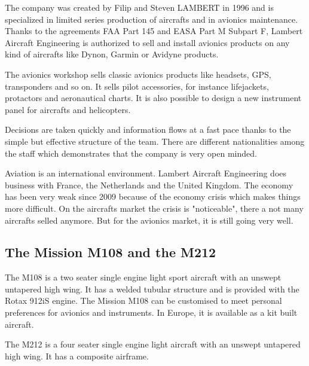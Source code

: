 \documentclass[11pt,a4paper]{article}
\begin{document}

The company was created by Filip and Steven LAMBERT in 1996 and is specialized in limited series production of aircrafts and in avionics maintenance. Thanks to the agreements FAA Part 145 and EASA Part M Subpart F, Lambert Aircraft Engineering is authorized to sell and install avionics products on any kind of aircrafts like Dynon, Garmin or Avidyne products.

\bigskip

The avionics workshop sells classic avionics products like headsets, GPS, transponders and so on. It sells pilot accessories, for instance lifejackets, protactors and aeronautical charts. It is also possible to design a new instrument panel for aircrafts and helicopters.

\bigskip

Decisions are taken quickly and information flows at a fast pace thanks to the simple but effective structure of the team.  There are different nationalities among the staff which demonstrates that the company is very open minded.

\bigskip

Aviation is an international environment. Lambert Aircraft Engineering does business with France, the Netherlands and the United Kingdom. The economy has been very weak since 2009 because of the economy crisis which makes things more difficult. On the aircrafts market the crisis is "noticeable", there a not many aircrafts selled anymore. But for the avionics market, it is still going very well.

\subsection{The Mission M108 and the M212}

The M108 is a two seater single engine light sport aircraft with an unswept untapered high wing. It has a welded tubular structure and is provided with the Rotax 912iS engine. The Mission M108 can be customised to meet personal preferences for avionics and instruments. In Europe, it is available as a kit built aircraft.

\bigskip

The M212 is a four seater single engine light aircraft with an unswept untapered high wing. It has a composite airframe.
\end{document}
